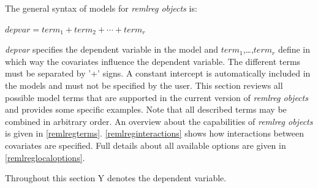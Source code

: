 The general syntax of models for {\em remlreg objects} is:

$depvar = term_1 + term_2 + \cdots + term_r$

{\em depvar} specifies the dependent variable in the model and
$term_1$,\dots,$term_r$ define in which way the covariates
influence the dependent variable. The different terms must be
separated by '+' signs. A constant intercept is automatically
included in the models and must not be specified by the user. This
section reviews all possible model terms that are supported in the
current version of {\em remlreg objects} and provides some
specific examples. Note that all described terms may be combined
in arbitrary order. An overview about the capabilities of {\em
remlreg objects} is given in \autoref{remlregterms}.
\autoref{remlreginteractions} shows how interactions between
covariates are specified. Full details about all available options
are given in \autoref{remlreglocaloptions}.

Throughout this section Y denotes the dependent variable.

